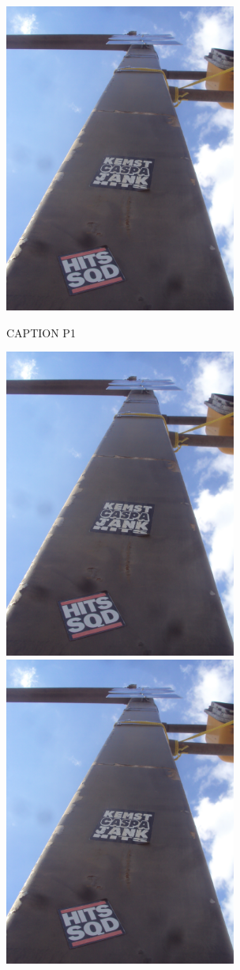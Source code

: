 \documentclass[10pt,letterpaper]{article}
\begin{document}
\includegraphics[height=4in]{portrait.jpg}

CAPTION P1\\
\pagebreak

\includegraphics[height=4in]{portrait.jpg}
\includegraphics[height=4in]{portrait.jpg}
\end{document}
